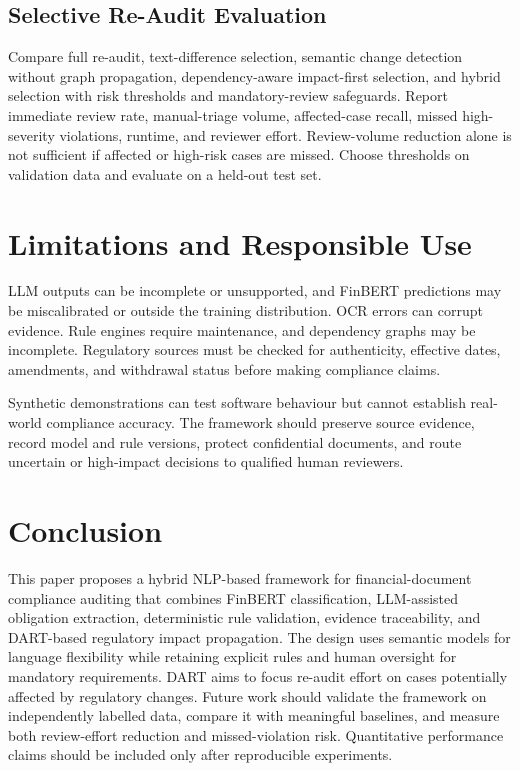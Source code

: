\documentclass[conference]{IEEEtran}
\begin{document}
\subsection{Selective Re-Audit Evaluation}
Compare full re-audit, text-difference selection, semantic change detection without graph propagation, dependency-aware impact-first selection, and hybrid selection with risk thresholds and mandatory-review safeguards. Report immediate review rate, manual-triage volume, affected-case recall, missed high-severity violations, runtime, and reviewer effort. Review-volume reduction alone is not sufficient if affected or high-risk cases are missed. Choose thresholds on validation data and evaluate on a held-out test set.

\section{Limitations and Responsible Use}
LLM outputs can be incomplete or unsupported, and FinBERT predictions may be miscalibrated or outside the training distribution. OCR errors can corrupt evidence. Rule engines require maintenance, and dependency graphs may be incomplete. Regulatory sources must be checked for authenticity, effective dates, amendments, and withdrawal status before making compliance claims.

Synthetic demonstrations can test software behaviour but cannot establish real-world compliance accuracy. The framework should preserve source evidence, record model and rule versions, protect confidential documents, and route uncertain or high-impact decisions to qualified human reviewers.

\section{Conclusion}
This paper proposes a hybrid NLP-based framework for financial-document compliance auditing that combines FinBERT classification, LLM-assisted obligation extraction, deterministic rule validation, evidence traceability, and DART-based regulatory impact propagation. The design uses semantic models for language flexibility while retaining explicit rules and human oversight for mandatory requirements. DART aims to focus re-audit effort on cases potentially affected by regulatory changes. Future work should validate the framework on independently labelled data, compare it with meaningful baselines, and measure both review-effort reduction and missed-violation risk. Quantitative performance claims should be included only after reproducible experiments.
\end{document}
